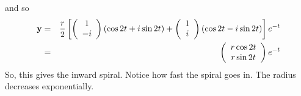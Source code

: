 \documentclass[12pt]{article}
\begin{document}
{\begin{enumerate}
and so
\begin{eqnarray*}
{\bf y}&=&\frac{r}{2}\left[\left(\begin{array}{cc}1\\-i\end{array}\right)(\cos{2t}+i\sin{2t})+\left(\begin{array}{cc}1\\i\end{array}\right)(\cos{2t}-i\sin{2t})\right]e^{-t}\\
&=&\left(\begin{array}{cc} r\cos{2t}\\ r\sin{2t}\end{array}\right)e^{-t}
\end{eqnarray*}
So, this gives the inward spiral. Notice how fast the spiral goes
in. The radius decreases exponentially.
\begin{center}
\end{center}
\end{enumerate}
}
\end{document}
